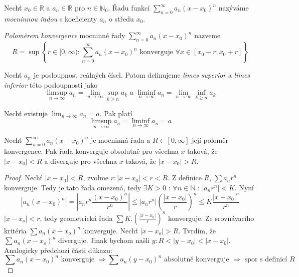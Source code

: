 \begin{definice}
Nechť $x_0 \in \mathbb{R}$ a $a_n \in \mathbb{R}$ pro $n \in \mathbb{N}_0$. Řadu funkcí $\sum_{n=0}^{\infty} a_n (x-x_0)^n$ nazýváme \emph{mocninnou řadou} s koeficienty $a_n$ o středu $x_0$.
\end{definice}

\begin{definice}
\emph{Poloměrem konvergence} mocninné řady $\sum_{n=0}^{\infty} a_n (x-x_0)^n$ nazveme $$R = \sup \left\{ r \in [ 0,\infty ) : \sum_{n=0}^{\infty}  a_n ( x - x_0 )^n \textrm{ konverguje } \forall x \in [ x_0 - r; x_0 + r ] \right\}$$
\end{definice}

\begin{definice}
Nechť $a_n$ je posloupnost reálných čísel. Potom definujeme \emph{limes superior} a \emph{limes inferior} této posloupnosti jako
$$\limsup_{n \to \infty} a_n = \lim_{n \to \infty} \sup_{k \geq n} a_k \textrm{ a } \liminf_{n \to \infty} a_n = \lim_{n \to \infty} \inf_{k \geq n} a_k$$
\end{definice}

\begin{poznamka}
Nechť existuje $\lim_{n \to \infty} a_n = a$. Pak platí
$$\limsup_{n \to \infty} a_n = \liminf_{n \to \infty} a_n = a$$
\end{poznamka}

\begin{vetal}
\label{o poloměru konvergence mocninné řady}
Nechť $\sum_{n=0}^{\infty} a_n (x-x_0)^n$ je mocninná řada a $R \in [ 0, \infty ]$ její poloměr konvergence. Pak řada konverguje obsolutně pro všechna $x$ taková, že $| x - x_0| < R$ a diverguje pro všechna $x$ taková, že $| x - x_0 | > R$.
\end{vetal}

\begin{proof}
Nechť $|x-x_0|<R$, zvolme $r: |x-x_0|<r<R$. Z definice $R$, $\sum a_nr^n$ konverguje. Tedy je tato řada omezená, tedy $\exists K>0 \textrm{ : } \forall n \in \mathbb{N} \textrm{ : } |a_nr^n|<K$.
Nyní
$$|a_n(x-x_0)^n| = \left| a_n r^n \frac{(x-x_0)^n}{r^n} \right| \leq |a_nr^n| \left( \frac{|x-x_0|}{r} \right)^n \leq K \frac{|x-x_0|^n}{r^n} $$
$|x-x_o|<r$, tedy geometrická řada $\sum K. \left( \frac{|x-x_0|}{r} \right)^n$ konverguje. Ze srovnávacího kritéria $\sum a_n(x-x_o)^n$ konverguje.
Nechť $|x-x_o|>R$. Tvrdím, že $\sum a_n(x-x_o)^n$ diverguje. Jinak bychom našli $y: R< |y-x_0| < |x-x_0|$. Analogicky předchozí části důkazu:
$$\sum a_n(x-x_0)^n \textrm{ konverguje } \Rightarrow \sum a_n(y-x_0)^n \textrm{ absolutně konverguje } \Rightarrow \textrm{ spor s definicí } R$$
\end{proof}

